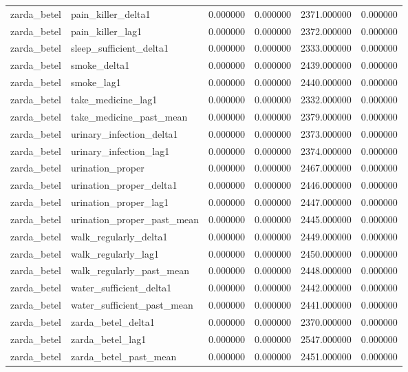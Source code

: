 \begin{longtable}{llrrrr}
zarda\_betel & pain\_killer\_delta1 & 0.000000 & 0.000000 & 2371.000000 & 0.000000 \\
zarda\_betel & pain\_killer\_lag1 & 0.000000 & 0.000000 & 2372.000000 & 0.000000 \\
zarda\_betel & sleep\_sufficient\_delta1 & 0.000000 & 0.000000 & 2333.000000 & 0.000000 \\
zarda\_betel & smoke\_delta1 & 0.000000 & 0.000000 & 2439.000000 & 0.000000 \\
zarda\_betel & smoke\_lag1 & 0.000000 & 0.000000 & 2440.000000 & 0.000000 \\
zarda\_betel & take\_medicine\_lag1 & 0.000000 & 0.000000 & 2332.000000 & 0.000000 \\
zarda\_betel & take\_medicine\_past\_mean & 0.000000 & 0.000000 & 2379.000000 & 0.000000 \\
zarda\_betel & urinary\_infection\_delta1 & 0.000000 & 0.000000 & 2373.000000 & 0.000000 \\
zarda\_betel & urinary\_infection\_lag1 & 0.000000 & 0.000000 & 2374.000000 & 0.000000 \\
zarda\_betel & urination\_proper & 0.000000 & 0.000000 & 2467.000000 & 0.000000 \\
zarda\_betel & urination\_proper\_delta1 & 0.000000 & 0.000000 & 2446.000000 & 0.000000 \\
zarda\_betel & urination\_proper\_lag1 & 0.000000 & 0.000000 & 2447.000000 & 0.000000 \\
zarda\_betel & urination\_proper\_past\_mean & 0.000000 & 0.000000 & 2445.000000 & 0.000000 \\
zarda\_betel & walk\_regularly\_delta1 & 0.000000 & 0.000000 & 2449.000000 & 0.000000 \\
zarda\_betel & walk\_regularly\_lag1 & 0.000000 & 0.000000 & 2450.000000 & 0.000000 \\
zarda\_betel & walk\_regularly\_past\_mean & 0.000000 & 0.000000 & 2448.000000 & 0.000000 \\
zarda\_betel & water\_sufficient\_delta1 & 0.000000 & 0.000000 & 2442.000000 & 0.000000 \\
zarda\_betel & water\_sufficient\_past\_mean & 0.000000 & 0.000000 & 2441.000000 & 0.000000 \\
zarda\_betel & zarda\_betel\_delta1 & 0.000000 & 0.000000 & 2370.000000 & 0.000000 \\
zarda\_betel & zarda\_betel\_lag1 & 0.000000 & 0.000000 & 2547.000000 & 0.000000 \\
zarda\_betel & zarda\_betel\_past\_mean & 0.000000 & 0.000000 & 2451.000000 & 0.000000 \\

\end{longtable}
